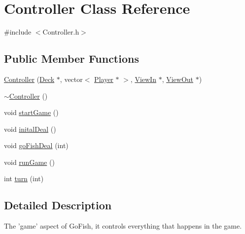 \hypertarget{class_controller}{\section{Controller Class Reference}
\label{class_controller}
}


{\ttfamily \#include $<$Controller.\-h$>$}

\subsection*{Public Member Functions}
\begin{DoxyCompactItemize}
\item 
\hyperlink{class_controller_acc5b83a368d1b5985f34d28e23c0f4c5}{Controller} (\hyperlink{class_deck}{Deck} $\ast$, vector$<$ \hyperlink{class_player}{Player} $\ast$ $>$, \hyperlink{class_view_in}{View\-In} $\ast$, \hyperlink{class_view_out}{View\-Out} $\ast$)
\item 
\hyperlink{class_controller_a0ab87934c4f7a266cfdb86e0f36bc1b5}{$\sim$\-Controller} ()
\item 
void \hyperlink{class_controller_a3a9e81ea10c63eea81c2612ba3beb5c4}{start\-Game} ()
\item 
void \hyperlink{class_controller_aa2a6716682fa463fc3d6bbdb510630e5}{inital\-Deal} ()
\item 
void \hyperlink{class_controller_aa93207ee72313ca40934a10bf36adca9}{go\-Fish\-Deal} (int)
\item 
void \hyperlink{class_controller_ad65603733541eb7698575f02de8f639d}{run\-Game} ()
\item 
int \hyperlink{class_controller_a9f08004e5e9c6462d188be01d07befe8}{turn} (int)
\end{DoxyCompactItemize}


\subsection{Detailed Description}
The 'game' aspect of Go\-Fish, it controls everything that happens in the game. 

